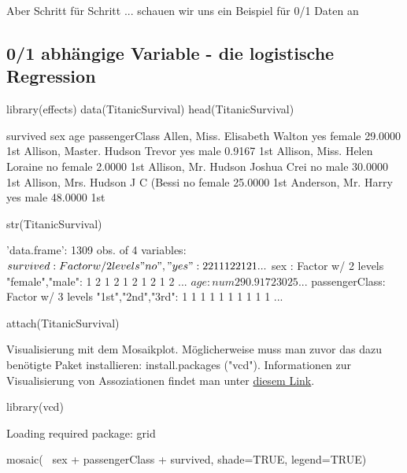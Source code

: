 \documentclass[a4paper,twoside]{tufte-book}\usepackage[]{graphicx}\usepackage[]{color}
\begin{document}
\begin{appendices}
Aber Schritt für Schritt ... schauen wir uns ein Beispiel für 0/1 Daten an


\subsection{0/1 abhängige Variable - die logistische Regression}

\begin{Schunk}
\begin{Sinput}
library(effects) 
data(TitanicSurvival)
head(TitanicSurvival)
\end{Sinput}
\begin{Soutput}
                                survived    sex     age passengerClass
Allen, Miss. Elisabeth Walton        yes female 29.0000            1st
Allison, Master. Hudson Trevor       yes   male  0.9167            1st
Allison, Miss. Helen Loraine          no female  2.0000            1st
Allison, Mr. Hudson Joshua Crei       no   male 30.0000            1st
Allison, Mrs. Hudson J C (Bessi       no female 25.0000            1st
Anderson, Mr. Harry                  yes   male 48.0000            1st
\end{Soutput}
\begin{Sinput}
str(TitanicSurvival)
\end{Sinput}
\begin{Soutput}
'data.frame':	1309 obs. of  4 variables:
 $ survived      : Factor w/ 2 levels "no","yes": 2 2 1 1 1 2 2 1 2 1 ...
 $ sex           : Factor w/ 2 levels "female","male": 1 2 1 2 1 2 1 2 1 2 ...
 $ age           : num  29 0.917 2 30 25 ...
 $ passengerClass: Factor w/ 3 levels "1st","2nd","3rd": 1 1 1 1 1 1 1 1 1 1 ...
\end{Soutput}
\begin{Sinput}
attach(TitanicSurvival)
\end{Sinput}
\end{Schunk}

Visualisierung mit dem Mosaikplot. Möglicherweise muss man zuvor das dazu benötigte Paket installieren: install.packages ("vcd"). Informationen zur Visualisierung von Assoziationen findet man unter \href{http://www.statmethods.net/advgraphs/mosaic.html}{diesem Link}.

\begin{Schunk}
\begin{Sinput}
library(vcd)
\end{Sinput}
\begin{Soutput}
Loading required package: grid
\end{Soutput}
\begin{Sinput}
mosaic(~ sex + passengerClass + survived, shade=TRUE, legend=TRUE) 
\end{Sinput}


\end{Schunk}
\end{appendices}
\end{document}

